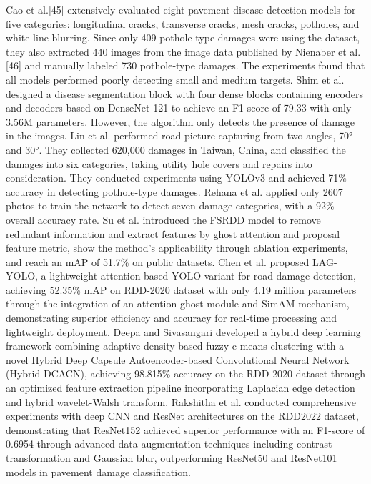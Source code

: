 \documentclass[sensors,article,submit,moreauthors]{Definitions/mdpi}
\begin{document}
    Cao et al.[45]\citep{cao2020survey} extensively evaluated eight pavement disease detection models for five categories: longitudinal cracks, transverse cracks, mesh cracks, potholes, and white line blurring. Since only 409 pothole-type damages were using the dataset, they also extracted 440 images from the image data published by Nienaber et al.[46]\citep{nienaber2015comparison} and manually labeled 730 pothole-type damages. The experiments found that all models performed poorly detecting small and medium targets.
    Shim et al.\citep{shim2021road} designed a disease segmentation block with four dense blocks containing encoders and decoders based on DenseNet-121 to achieve an F1-score of 79.33 with only 3.56M parameters. However, the algorithm only detects the presence of damage in the images. Lin et al.\citep{lin2021implementation} performed road picture capturing from two angles, 70° and 30°. They collected 620,000 damages in Taiwan, China, and classified the damages into six categories, taking utility hole covers and repairs into consideration. They conducted experiments using YOLOv3 and achieved 71\% accuracy in detecting pothole-type damages. Rehana et al.\citep{rehanak2022road} applied only 2607 photos to train the network to detect seven damage categories, with a 92\% overall accuracy rate. Su et al.\citep{su2022fsrdd} introduced the FSRDD model to remove redundant information and extract features by ghost attention and proposal feature metric, show the method’s applicability through ablation experiments, and reach an mAP of 51.7\% on public datasets. Chen et al.\citep{chen2024lag} proposed LAG-YOLO, a lightweight attention-based YOLO variant for road damage detection, achieving 52.35\% mAP on RDD-2020 dataset with only 4.19 million parameters through the integration of an attention ghost module and SimAM mechanism, demonstrating superior efficiency and accuracy for real-time processing and lightweight deployment. Deepa and Sivasangari\citep{deepa2023effective} developed a hybrid deep learning framework combining adaptive density-based fuzzy c-means clustering with a novel Hybrid Deep Capsule Autoencoder-based Convolutional Neural Network (Hybrid DCACN), achieving 98.815\% accuracy on the RDD-2020 dataset through an optimized feature extraction pipeline incorporating Laplacian edge detection and hybrid wavelet-Walsh transform. Rakshitha et al.\citep{rakshitha2024deep} conducted comprehensive experiments with deep CNN and ResNet architectures on the RDD2022\citep{arya2022rdd2022} dataset, demonstrating that ResNet152 achieved superior performance with an F1-score of 0.6954 through advanced data augmentation techniques including contrast transformation and Gaussian blur, outperforming ResNet50 and ResNet101 models in pavement damage classification.
\end{document}

